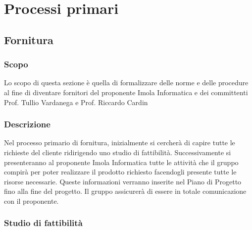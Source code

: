 \section{Processi primari}
\subsection{Fornitura}
\subsubsection{Scopo}
Lo scopo di questa sezione è quella di formalizzare delle norme e delle procedure al fine di diventare fornitori del proponente Imola Informatica e dei committenti Prof. Tullio Vardanega e Prof. Riccardo Cardin 


\subsubsection{Descrizione} 
Nel processo primario di fornitura, inizialmente si cercherà di capire tutte le richieste del cliente ridirigendo uno studio di fattibilità. 
Successivamente si presenteranno al proponente Imola Informatica tutte le attività che il gruppo \Gruppo compirà per poter realizzare il prodotto richiesto facendogli presente tutte le risorse necessarie. Queste informazioni verranno inserite nel Piano di Progetto fino alla fine del progetto.
Il gruppo \Gruppo assicurerà di essere in totale comunicazione con il proponente.


\subsubsection{Studio di fattibilità}

